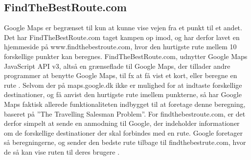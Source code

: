 \subsection{FindTheBestRoute.com}
Google Maps er begrænset til kun at kunne vise vejen fra et punkt til et andet. Det har FindTheBestRoute.com taget kampen op imod, og har derfor lavet en hjemmeside på www.findthebestroute.com, hvor den hurtigste rute mellem 10 forskellige punkter kan beregnes. FindTheBestRoute.com, udnytter Google Maps JavaScript API v3, altså en grænseflade til Google Maps, der tillader andre programmer at benytte Google Maps, til fx at få vist et kort, eller beregne en rute \citep{ftbr}.\newline
Selvom der på maps.google.dk ikke er mulighed for at indtaste forskellige destinationer, og få anvist den hurtigste rute imellem punkterne, så har Google Maps faktisk allerede funktionaliteten indbygget til at foretage denne beregning, baseret på ”The Travelling Salesman Problem”.\newline
For findthebestroute.com, er det derfor simpelt at sende en anmodning til Google, der indeholder informationer om de forskellige destinationer der skal forbindes med en rute. Google foretager så beregningerne, og sender den bedste rute tilbage til findthebestrute.com, hvor de så kan vise ruten til deres brugere \citep{googleapi}.
